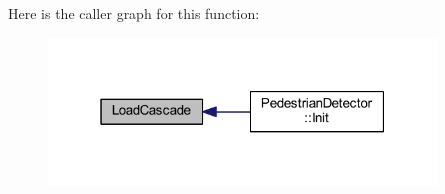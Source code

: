 Here is the caller graph for this function\+:\nopagebreak
\begin{figure}[H]
\begin{center}
\leavevmode
\includegraphics[width=292pt]{c4-pedestrian-detector_8h_a1c2c730891bb9a5800d3761e8cfaa160_icgraph}
\end{center}
\end{figure}
